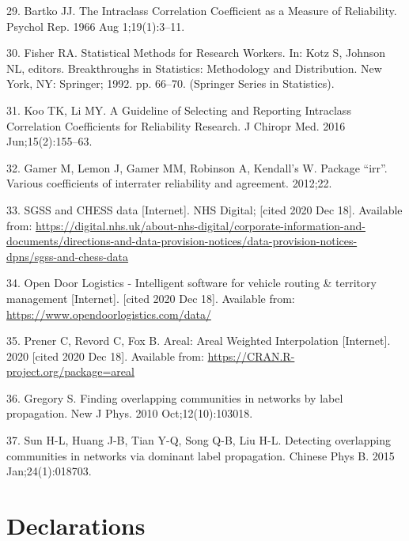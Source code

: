 \documentclass[
]{article}
\begin{document}
\leavevmode\hypertarget{ref-bartkoIntraclassCorrelationCoefficient1966}{}%
29. Bartko JJ. The Intraclass Correlation Coefficient as a Measure of
Reliability. Psychol Rep. 1966 Aug 1;19(1):3--11.

\leavevmode\hypertarget{ref-fisherStatisticalMethodsResearch1992}{}%
30. Fisher RA. Statistical Methods for Research Workers. In: Kotz S,
Johnson NL, editors. Breakthroughs in Statistics: Methodology and
Distribution. New York, NY: Springer; 1992. pp. 66--70. (Springer Series
in Statistics).

\leavevmode\hypertarget{ref-kooGuidelineSelectingReporting2016}{}%
31. Koo TK, Li MY. A Guideline of Selecting and Reporting Intraclass
Correlation Coefficients for Reliability Research. J Chiropr Med. 2016
Jun;15(2):155--63.

\leavevmode\hypertarget{ref-gamer2012package}{}%
32. Gamer M, Lemon J, Gamer MM, Robinson A, Kendall's W. Package
``irr''. Various coefficients of interrater reliability and agreement.
2012;22.

\leavevmode\hypertarget{ref-SGSSCHESSData}{}%
33. SGSS and CHESS data {[}Internet{]}. NHS Digital; {[}cited 2020 Dec
18{]}. Available from:
\url{https://digital.nhs.uk/about-nhs-digital/corporate-information-and-documents/directions-and-data-provision-notices/data-provision-notices-dpns/sgss-and-chess-data}

\leavevmode\hypertarget{ref-OpenDoorLogistics}{}%
34. Open Door Logistics - Intelligent software for vehicle routing \&
territory management {[}Internet{]}. {[}cited 2020 Dec 18{]}. Available
from: \url{https://www.opendoorlogistics.com/data/}

\leavevmode\hypertarget{ref-prenerArealArealWeighted2020}{}%
35. Prener C, Revord C, Fox B. Areal: Areal Weighted Interpolation
{[}Internet{]}. 2020 {[}cited 2020 Dec 18{]}. Available from:
\url{https://CRAN.R-project.org/package=areal}

\leavevmode\hypertarget{ref-gregoryFindingOverlappingCommunities2010}{}%
36. Gregory S. Finding overlapping communities in networks by label
propagation. New J Phys. 2010 Oct;12(10):103018.

\leavevmode\hypertarget{ref-sunDetectingOverlappingCommunities2015}{}%
37. Sun H-L, Huang J-B, Tian Y-Q, Song Q-B, Liu H-L. Detecting
overlapping communities in networks via dominant label propagation.
Chinese Phys B. 2015 Jan;24(1):018703.

\hypertarget{declarations}{%
\section{Declarations}\label{declarations}}
\end{document}
